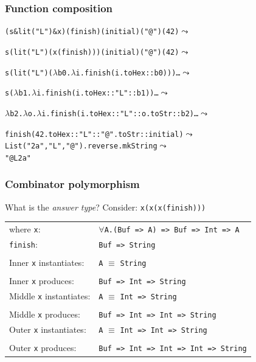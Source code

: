 \documentclass[14pt,t,usepdftitle=false,
xcolornames=x11names,svgnames,dvipsnames]{beamer}
\begin{document}
\begin{frame}[fragile]
  \frametitle{Function composition}
  \begin{alltt}\small\color{result}
(s \verb+&+ lit("L") \verb+&+ x) (finish) (initial) ("@") (42) \(\leadsto\)    

s(lit("L")({x}(finish))) (initial) ("@") (42) \(\leadsto\)

s({lit("L")}({\(\lambda\)b0.\(\lambda\)i.finish(i.toHex :: b0)})) \dots \(\leadsto\)

{s}(\(\lambda\)b1.\(\lambda\)i.finish(i.toHex :: "L" :: b1)) \dots \(\leadsto\)

\color{black}\(\lambda\)b2.\(\lambda\)o.\(\lambda\)i.finish(i.toHex :: "L" :: o.toStr :: b2) \dots \(\leadsto\)

finish(42.toHex :: "L" :: "@".toStr :: initial) \(\leadsto\)
List("2a", "L", "@").reverse.mkString \(\leadsto\)
"@L2a"
  \end{alltt}
\end{frame}

\begin{frame}[fragile]
  \frametitle{Combinator polymorphism}
  What is the \emph{answer type}?
  Consider: \texttt{x(x(x(finish)))}
\medskip

  {\small
    \begin{tabular}[t]{ll}
      where \hfill \texttt{x}: & $\forall$\texttt{A.(Buf => A) => Buf => Int => A}
      \\
      \hfill\texttt{finish}: &\texttt{Buf => String}\\
      \\
    Inner \texttt{x} instantiates: &\texttt{A} $\equiv$ \texttt{String}\\
    \\
    Inner \texttt{x} produces: &\texttt{Buf => Int => String}\\
    Middle \texttt{x} instantiates: &\texttt{A} $\equiv$ \texttt{Int => String}\\
    \\
    Middle \texttt{x} produces: &\texttt{Buf => Int => Int => String}\\
    Outer \texttt{x} instantiates: &\texttt{A} $\equiv$ \texttt{Int => Int => String}\\
    \\
    Outer \texttt{x} produces: &\texttt{Buf => Int => Int => Int => String}
  \end{tabular}}

\end{frame}
\end{document}
